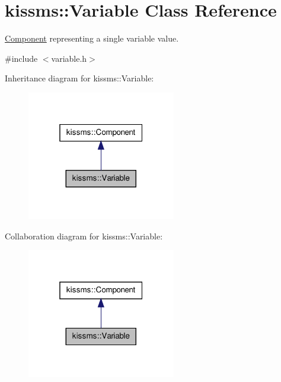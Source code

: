 \hypertarget{classkissms_1_1_variable}{\section{kissms\-:\-:Variable Class Reference}
\label{classkissms_1_1_variable}
}


\hyperlink{classkissms_1_1_component}{Component} representing a single variable value.  




{\ttfamily \#include $<$variable.\-h$>$}



Inheritance diagram for kissms\-:\-:Variable\-:
\nopagebreak
\begin{figure}[H]
\begin{center}
\leavevmode
\includegraphics[width=184pt]{classkissms_1_1_variable__inherit__graph}
\end{center}
\end{figure}


Collaboration diagram for kissms\-:\-:Variable\-:
\nopagebreak
\begin{figure}[H]
\begin{center}
\leavevmode
\includegraphics[width=184pt]{classkissms_1_1_variable__coll__graph}
\end{center}
\end{figure}
